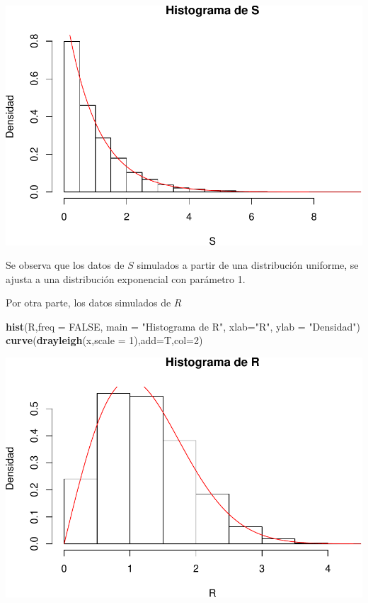\documentclass[]{article}
\newenvironment{Shaded}{\begin{snugshade}}{\end{snugshade}}
\newcommand{\KeywordTok}[1]{\textcolor[rgb]{0.13,0.29,0.53}{\textbf{#1}}}
\newcommand{\DataTypeTok}[1]{\textcolor[rgb]{0.13,0.29,0.53}{#1}}
\newcommand{\DecValTok}[1]{\textcolor[rgb]{0.00,0.00,0.81}{#1}}
\newcommand{\StringTok}[1]{\textcolor[rgb]{0.31,0.60,0.02}{#1}}
\newcommand{\OtherTok}[1]{\textcolor[rgb]{0.56,0.35,0.01}{#1}}
\newcommand{\NormalTok}[1]{#1}
\begin{document}
\includegraphics{notebook_simulaciones_files/figure-latex/unnamed-chunk-10-1.pdf}

Se observa que los datos de \(S\) simulados a partir de una distribución
uniforme, se ajusta a una distribución exponencial con parámetro 1.

Por otra parte, los datos simulados de \(R\)

\begin{Shaded}
\begin{Highlighting}[]
\KeywordTok{hist}\NormalTok{(R,}\DataTypeTok{freq =} \OtherTok{FALSE}\NormalTok{, }\DataTypeTok{main =} \StringTok{"Histograma de R"}\NormalTok{, }\DataTypeTok{xlab=}\StringTok{"R"}\NormalTok{, }\DataTypeTok{ylab =} \StringTok{"Densidad"}\NormalTok{)}
\KeywordTok{curve}\NormalTok{(}\KeywordTok{drayleigh}\NormalTok{(x,}\DataTypeTok{scale =} \DecValTok{1}\NormalTok{),}\DataTypeTok{add=}\NormalTok{T,}\DataTypeTok{col=}\DecValTok{2}\NormalTok{)}
\end{Highlighting}
\end{Shaded}

\includegraphics{notebook_simulaciones_files/figure-latex/unnamed-chunk-11-1.pdf}
\end{document}
